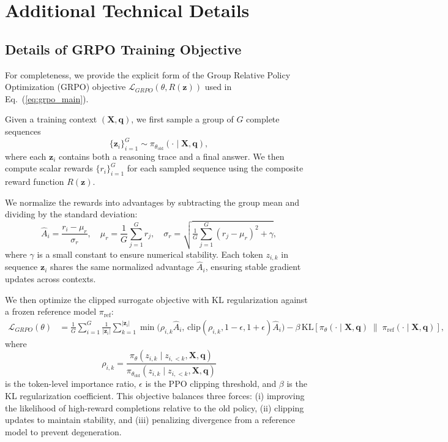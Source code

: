 \documentclass[twoside]{article}
\begin{document}






\clearpage
\appendix
\thispagestyle{empty}

\onecolumn

\section{Additional Technical Details}

\subsection{Details of GRPO Training Objective}
\label{app:grpo}
For completeness, we provide the explicit form of the Group Relative Policy Optimization (GRPO) objective $\mathcal{L}_{GRPO}(\theta, R(\mathbf{z}))$ \citep{guo2025deepseek} used in Eq.~(\ref{eq:grpo_main}).

Given a training context $(\mathbf{X}, \mathbf{q})$, we first sample a group of $G$ complete sequences
\[
\bigl\{ \mathbf{z}_i \bigr\}_{i=1}^G \sim \pi_{\theta_{\mathrm{old}}}(\cdot \mid \mathbf{X}, \mathbf{q}),
\]
where each $\mathbf{z}_i$ contains both a reasoning trace and a final answer. We then compute scalar rewards $\{r_i\}_{i=1}^G$ for each sampled sequence using the composite reward function $R(\mathbf{z})$.  

We normalize the rewards into advantages by subtracting the group mean and dividing by the standard deviation:
\[
\hat{A}_i = \frac{r_i - \mu_r}{\sigma_r}, 
\quad 
\mu_r = \frac{1}{G} \sum_{j=1}^G r_j,
\quad 
\sigma_r = \sqrt{\tfrac{1}{G} \sum_{j=1}^G (r_j - \mu_r)^2 + \gamma},
\]
where $\gamma$ is a small constant to ensure numerical stability.  
Each token $z_{i,k}$ in sequence $\mathbf{z}_i$ shares the same normalized advantage $\hat{A}_i$, ensuring stable gradient updates across contexts.

We then optimize the clipped surrogate objective with KL regularization against a frozen reference model $\pi_{\mathrm{ref}}$:
\begin{align*}
\mathcal{L}_{GRPO}(\theta) 
&= \frac{1}{G} \sum_{i=1}^G \frac{1}{|\mathbf{z}_i|} \sum_{k=1}^{|\mathbf{z}_i|} 
\min\!\bigl(\rho_{i,k} \hat{A}_i,\, 
\mathrm{clip}(\rho_{i,k}, 1-\epsilon, 1+\epsilon) \hat{A}_i \bigr) - \beta \, \mathrm{KL}\!\left[\pi_\theta(\cdot \mid \mathbf{X},\mathbf{q}) \;\|\; \pi_{\mathrm{ref}}(\cdot \mid \mathbf{X},\mathbf{q})\right],
\end{align*}
where
\[
\rho_{i,k} = \frac{\pi_\theta(z_{i,k} \mid z_{i,<k}, \mathbf{X}, \mathbf{q})}{\pi_{\theta_{\mathrm{old}}}(z_{i,k} \mid z_{i,<k}, \mathbf{X}, \mathbf{q})}
\]
is the token-level importance ratio, $\epsilon$ is the PPO clipping threshold, and $\beta$ is the KL regularization coefficient. This objective balances three forces: (i) improving the likelihood of high-reward completions relative to the old policy, (ii) clipping updates to maintain stability, and (iii) penalizing divergence from a reference model to prevent degeneration.
\end{document}
